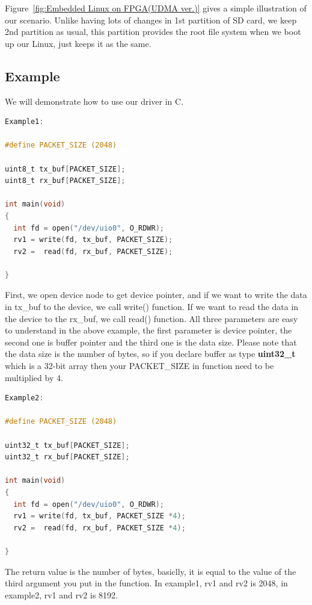 Figure~\ref{fig:Embedded Linux on FPGA(UDMA ver.)} gives a simple illustration of our scenario. Unlike having lots of changes in 1st partition of SD card, we keep 2nd partition as usual, this partition provides the root file system when we boot up our Linux, just keeps it as the same.
\newpage

\subsection{Example}
\label{subsec:Example}
We will demonstrate how to use our driver in C.

{\renewcommand\baselinestretch{0.8}\selectfont
\begin{lstlisting}[frame=single,language=C]
Example1:

#define PACKET_SIZE (2048)

uint8_t tx_buf[PACKET_SIZE];
uint8_t rx_buf[PACKET_SIZE];

int main(void)
{
  int fd = open("/dev/uio0", O_RDWR);
  rv1 = write(fd, tx_buf, PACKET_SIZE);
  rv2 =  read(fd, rx_buf, PACKET_SIZE);

}
\end{lstlisting}
\par}

First, we open device node to get device pointer, and if we want to write the data in tx_buf to the device, we call write() function. If we want to read the data in the device to the rx_buf, we call read() function. All three parameters are easy to understand in the above example, the first parameter is device pointer, the second one is buffer pointer and the third one is the data size. Please note that the data size is the number of bytes, so if you declare buffer as type \textbf{uint32_t} which is a 32-bit array then your PACKET_SIZE in function need to be multiplied by 4. 

{\renewcommand\baselinestretch{0.8}\selectfont
\begin{lstlisting}[frame=single,language=C]
Example2:

#define PACKET_SIZE (2048)

uint32_t tx_buf[PACKET_SIZE];
uint32_t rx_buf[PACKET_SIZE];

int main(void)
{
  int fd = open("/dev/uio0", O_RDWR);
  rv1 = write(fd, tx_buf, PACKET_SIZE *4);
  rv2 =  read(fd, rx_buf, PACKET_SIZE *4);

}
\end{lstlisting}
\par}

The return value is the number of bytes, basiclly, it is equal to the value of the third argument you put in the function.
In example1, rv1 and rv2 is 2048, in example2, rv1 and rv2 is 8192.